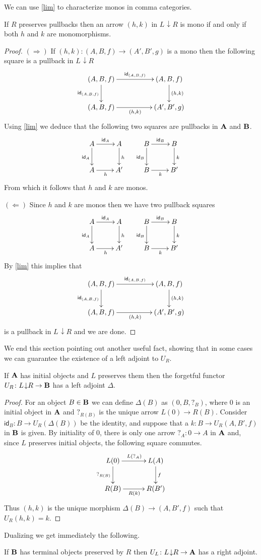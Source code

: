 \documentclass[runningheads,envcountsect]{llncs}
\def\B{\textbf {\textup{B}}}
\def\A{\textbf {\textup{A}}}
\newcommand{\comma}[2]{#1\hspace{1pt} {\downarrow}#2}
\newcommand{\id}[1]{\mathsf{id}_{#1}}
\begin{document}
We can use \cref{lim} to characterize monos in comma categories. 
\begin{corollary}\label{cor:mono}
	If $R$ preserves pullbacks then an arrow $(h,k)$ in $\comma{L}{R}$ is mono if and only if both $h$ and $k$ are monomorphisms.
\end{corollary}
\begin{proof}
	$(\Rightarrow)$  If $(h,k)\colon (A,B,f)\to (A', B', g)$ is a mono then the following square is a pullback in $\comma{L}{R}$
	\[\xymatrix@C=50pt{(A, B, f)  \ar[r]^{\id{(A,B,f)}} \ar[d]_{\id{(A,B,f)}}& (A, B, f)  \ar[d]^{(h,k)} \\ (A, B, f)  \ar[r]_{(h,k)}& (A', B', g) }\]
	Using \cref{lim} we deduce that the following two squares are pullbacks in $\A$ and $\B$.
	\[\xymatrix{A \ar[r]^{\id{A}} \ar[d]_{\id{A}} & A \ar[d]^{h} & B \ar[r]^{\id{B}} \ar[d]_{\id{B}} & B  \ar[d]^{k}\\ A \ar[r]_{h} & A' & B \ar[r]_{k} & B'}\]
	From which it follows that $h$ and $k$ are monos.
	
	\smallskip\noindent 
	$(\Leftarrow)$ Since $h$ and $k$ are monos then we have two pullback squares 	
	\[\xymatrix{A \ar[r]^{\id{A}} \ar[d]_{\id{A}} & A \ar[d]^{h} & B \ar[r]^{\id{B}} \ar[d]_{\id{B}} & B  \ar[d]^{k}\\ A \ar[r]_{h} & A' & B \ar[r]_{k} & B'}\]
	By \cref{lim} this implies that 
	\[\xymatrix@C=50pt{(A, B, f)  \ar[r]^{\id{(A,B,f)}} \ar[d]_{\id{(A,B,f)}}& (A, B, f)  \ar[d]^{(h,k)} \\ (A, B, f)  \ar[r]_{(h,k)}& (A', B', g) }\]
	is a pullback in $\comma{L}{R}$ and we are done.
\end{proof}

We end this section pointing out another useful fact,  showing that in some cases we can guarantee  the existence of a left adjoint to $U_R$. 

\begin{proposition}\label{prop:left}
	If $\A$ has initial objects and $L$ preserves them then the forgetful functor $U_R\colon \comma{L}{R}\to \B$ has a left adjoint $\Delta$.
\end{proposition}
\begin{proof} For an object $B\in \B$ we can define $\Delta(B)$ as $(0, B, ?_{B})$, where $0$ is an initial object in $\A$ and $?_{R(B)}$ is the unique arrow $L(0)\to R(B)$. Consider $\id{B}\colon B\to U_R(\Delta(B))$ be the identity, and suppose that a $k\colon B\to U_R(A, B', f)$ in $\B$ is given. By initiality of $0$, there is only one arrow $?_A\colon 0\to A $ in $\A$ and, since $L$ preserves initial objects, the following square commutes.
	\[\xymatrix@C=30pt{L(0) \ar[r]^{L(?_A)} \ar[d]_{?_{R(B)}} & L(A) \ar[d]^{f}\\ R(B) \ar[r]_{R(k)}& R(B')}\]
	Thus $(h,k)$ is the unique morphism $\Delta(B)\to (A, B', f)$	such that $U_R(h,k)=k$.
\end{proof}
Dualizing we get immediately the following.
\begin{corollary}If $\B$ has terminal objects preserved by $R$ then $U_L\colon \comma{L}{R}\to \A$ has a right adjoint.
\end{corollary}
\end{document}
